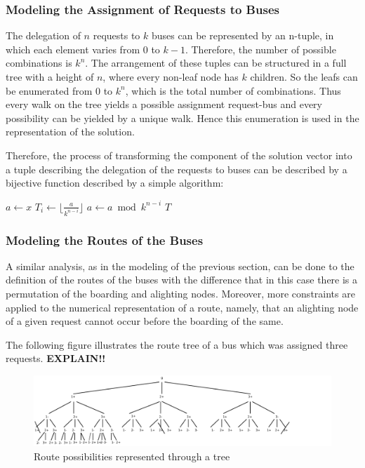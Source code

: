\documentclass[tuberlin,cic,tc,openright,english,noabntcite]{iiufrgs}
\begin{document}
\subsubsection{Modeling the Assignment of Requests to Buses}
The delegation of $n$ requests to $k$ buses can be represented by an n-tuple, in which each element varies from $0$ to $k-1$. Therefore, the number of possible combinations is $k^{n}$. The arrangement of these tuples can be structured in a full tree with a height of $n$, where every non-leaf node has $k$ children. So the leafs can be enumerated from $0$ to $k^{n}$, which is the total number of combinations. Thus every walk on the tree yields a possible assignment request-bus and every possibility can be yielded by a unique walk. Hence this enumeration is used in the representation of the solution.

Therefore, the process of transforming the component of the solution vector into a tuple describing the delegation of the requests to buses can be described by a bijective function described by a simple algorithm:

\begin{algorithmic}
\State $a \gets x$
	\State $\displaystyle T_{i} \gets \lfloor \frac{a}{k^{n-i}} \rfloor$
	\State $a \gets a \bmod k^{n-i}$
\EndFor
\State \Return $T$
\EndFunction
\end{algorithmic}

\subsubsection{Modeling the Routes of the Buses}
A similar analysis, as in the modeling of the previous section, can be done to the definition of the routes of the buses with the difference that in this case there is a permutation of the boarding and alighting nodes. Moreover, more constraints are applied to the numerical representation of a route, namely, that an alighting node of a given request cannot occur before the boarding of the same.

The following figure illustrates the route tree of a bus which was assigned three requests. \textbf{EXPLAIN!!}

\begin{figure}[H]
    \caption{Route possibilities represented through a tree}
    \begin{center}
        \includegraphics[scale=0.9]{fig_tree_bus_route}
    \end{center}
    \label{fig:tree_bus_route}
\end{figure}
\end{document}
